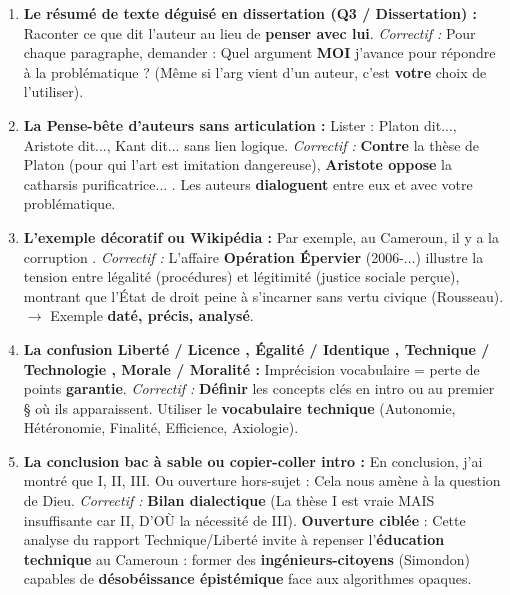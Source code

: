 \documentclass[11pt]{article}
\newcommand{\cle}[1]{{\popxbold\color{popdark}#1}}
\begin{document}
\begin{attention}
\begin{enumerate}
    \item \textbf{\og Le résumé de texte déguisé en dissertation \fg (Q3 / Dissertation) :} Raconter ce que dit l'auteur au lieu de \textbf{penser avec lui}. \textit{Correctif :} Pour chaque paragraphe, demander : \og Quel argument \textbf{MOI} j'avance pour répondre à la problématique ? \fg (Même si l'arg vient d'un auteur, c'est \textbf{votre} choix de l'utiliser).
    \item \textbf{\og La \og Pense-bête \fg d'auteurs sans articulation \fg :} Lister : \og Platon dit..., Aristote dit..., Kant dit... \fg sans lien logique. \textit{Correctif :} \og \textbf{Contre} la thèse de Platon (pour qui l'art est imitation dangereuse), \textbf{Aristote oppose} la catharsis purificatrice... \fg. Les auteurs \textbf{dialoguent} entre eux et avec votre problématique.
    \item \textbf{\og L'exemple \og décoratif \fg ou \og Wikipédia \fg \fg :} \og Par exemple, au Cameroun, il y a la corruption \fg. \textit{Correctif :} \og L'affaire \textbf{Opération Épervier} (2006-...) illustre la tension entre \cle{légalité} (procédures) et \cle{légitimité} (justice sociale perçue), montrant que l'État de droit peine à s'incarner sans \cle{vertu civique} (Rousseau). \fg $\rightarrow$ Exemple \textbf{daté, précis, analysé}.
    \item \textbf{\og La confusion \og Liberté / Licence \fg , \og Égalité / Identique \fg , \og Technique / Technologie \fg , \og Morale / Moralité \fg \fg :} Imprécision vocabulaire = perte de points \textbf{garantie}. \textit{Correctif :} \textbf{Définir} les concepts clés en intro ou au premier § où ils apparaissent. Utiliser le \textbf{vocabulaire technique} (\cle{Autonomie}, \cle{Hétéronomie}, \cle{Finalité}, \cle{Efficience}, \cle{Axiologie}).
    \item \textbf{\og La conclusion \og bac à sable \fg ou \og copier-coller intro \fg \fg :} \og En conclusion, j'ai montré que I, II, III. \fg Ou ouverture hors-sujet : \og Cela nous amène à la question de Dieu. \fg \textit{Correctif :} \textbf{Bilan dialectique} (La thèse I est vraie MAIS insuffisante car II, D'OÙ la nécessité de III). \textbf{Ouverture ciblée} : \og Cette analyse du rapport Technique/Liberté invite à repenser l'\textbf{éducation technique} au Cameroun : former des \textbf{ingénieurs-citoyens} (Simondon) capables de \textbf{désobéissance épistémique} face aux algorithmes opaques. \fg
\end{enumerate}
\end{attention}
\end{document}
